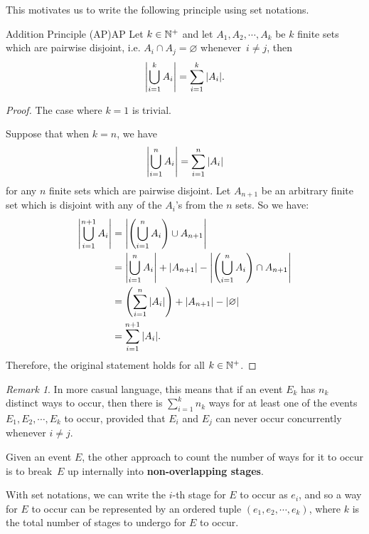 \documentclass[math]{amznotes}
\theoremstyle{remark}
\newtheorem*{remark}{Remark}
\newcommand{\0}{\mathbf{0}}
\newcommand{\1}{\mathbf{1}}
\begin{document}
This motivates us to write the following principle using set notations.
\begin{thmbox}{Addition Principle (AP)}{AP}
    Let $k \in \mathbb{N}^+$ and let $A_1, A_2, \cdots, A_k$ be $k$ finite sets which are pairwise disjoint, i.e. $A_i \cap A_j = \varnothing$ whenever~$i \neq j$, then
   \begin{equation*}
        {\left\lvert {\bigcup_{i = 1}^k A_i} \right\rvert} = \sum_{i = 1}^{k}{\left\lvert {A_i} \right\rvert}.
   \end{equation*} 
   \tcblower
   \begin{proof}
        The case where $k = 1$ is trivial.

        Suppose that when $k = n$, we have
        \begin{equation*}
            {\left\lvert {\bigcup_{i = 1}^n A_i} \right\rvert} = \sum_{i = 1}^{n}{\left\lvert {A_i} \right\rvert}
        \end{equation*} 
        for any $n$ finite sets which are pairwise disjoint. Let $A_{n + 1}$ be an arbitrary finite set which is disjoint with any of the $A_i$'s from the $n$ sets. So we have:
        \begin{align*}
            {\left\lvert {\bigcup_{i = 1}^{n + 1} A_i} \right\rvert} & = {\left\lvert {\left(\bigcup_{i = 1}^n A_i\right) \cup A_{n + 1}} \right\rvert} \\
            & = {\left\lvert {\bigcup_{i = 1}^n A_i} \right\rvert} + {\left\lvert {A_{n + 1}} \right\rvert} - {\left\lvert {\left(\bigcup_{i = 1}^n A_i\right) \cap A_{n + 1}} \right\rvert} \\
            & = \left(\sum_{i = 1}^{n}{\left\lvert {A_i} \right\rvert}\right) + {\left\lvert {A_{n + 1}} \right\rvert} - {\left\lvert {\varnothing} \right\rvert} \\
            & = \sum_{i = 1}^{n + 1}{\left\lvert {A_i} \right\rvert}.
        \end{align*}
        Therefore, the original statement holds for all $k \in \mathbb{N}^+$.
   \end{proof}
\end{thmbox}
\begin{notebox}
    \begin{remark}
        In more casual language, this means that if an event $E_k$ has $n_k$ distinct ways to occur, then there is $\sum_{i = 1}^{k}n_k$ ways for at least one of the events $E_1, E_2, \cdots, E_k$ to occur, provided that $E_i$ and $E_j$ can never occur concurrently whenever $i \neq j$.
    \end{remark}
\end{notebox}
Given an event $E$, the other approach to count the number of ways for it to occur is to break~$E$ up internally into \textbf{non-overlapping stages}.

With set notations, we can write the $i$-th stage for $E$ to occur as $e_i$, and so a way for $E$ to occur can be represented by an ordered tuple $(e_1, e_2, \cdots, e_k)$, where $k$ is the total number of stages to undergo for $E$ to occur.
\end{document}
